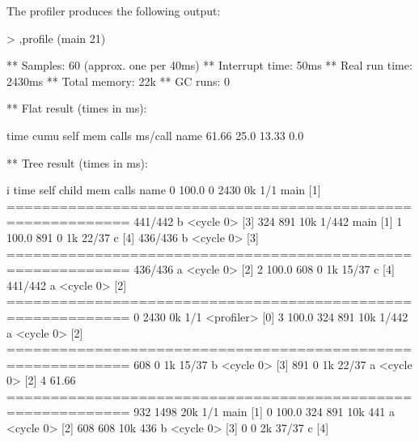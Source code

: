 The profiler produces the following output:

\begin{example}
> ,profile (main 21)

** Samples:        60 (approx. one per 40ms)
** Interrupt time: 50ms
** Real run time:  2430ms
** Total memory:   22k
** GC runs:        0

** Flat result (times in ms): 

   time   cumu   self   mem    calls  ms/call   name
 61.66%
  25.0%
 13.33%
   0.0%

** Tree result (times in ms): 

 i    time self  child  mem    calls   name
 0  100.0%
              0   2430   0k      1/1      main [1]
============================================================
                             441/442      b <cycle 0> [3]
            324    891  10k    1/442      main [1]
 1  100.0%
            891      0   1k    22/37      c [4]
                             436/436      b <cycle 0> [3]
============================================================
                             436/436      a <cycle 0> [2]
 2  100.0%
            608      0   1k    15/37      c [4]
                             441/442      a <cycle 0> [2]
============================================================
              0   2430   0k      1/1      <profiler> [0]
 3  100.0%
            324    891  10k    1/442      a <cycle 0> [2]
============================================================
            608      0   1k    15/37      b <cycle 0> [3]
            891      0   1k    22/37      a <cycle 0> [2]
 4  61.66%
============================================================
            932   1498  20k      1/1      main [1]
 0  100.0%
            324    891  10k      441      a <cycle 0> [2]
            608    608  10k      436      b <cycle 0> [3]
              0      0   2k    37/37      c [4]

\end{example}

